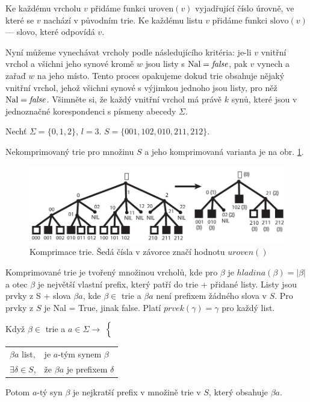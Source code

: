 \newcommand{\uro}{\textrm{uroven}}
Ke každému vrcholu $v$ přidáme funkci $\uro(v)$ vyjadřující číslo úrovně,
ve které se $v$ nachází v původním trie.
\newcommand{\slo}{\textrm{slovo}}
Ke každému listu $v$ přidáme funkci $\slo(v)$ --- slovo, které odpovídá $v$.

Nyní můžeme vynechávat vrcholy podle následujícího kritéria: 
je-li $v$ vnitřní vrchol a všichni jeho synové kromě $w$ jsou listy s
$\textrm{Nal} = \textit{false}$, pak $v$ vynech a zařaď $w$ na jeho místo. Tento proces 
opakujeme dokud trie obsahuje nějaký vnitřní vrchol, jehož všichni synové 
s výjimkou jednoho jsou listy, pro něž $\textrm{Nal} = \textit{false}$. 
Všimněte si, že každý vnitřní vrchol má právě $k$ synů, které jsou 
v jednoznačné korespondenci s písmeny abecedy $\Sigma$.

\begin{priklad}
Nechť $\Sigma = \{0,1,2\}$, $l=3$.
$S = \{ 001,102,010,211,212 \}$.

Nekomprimovaný trie pro množinu $S$ a jeho komprimovaná varianta je na
obr. \ref{fig:tries.compr1}.

\begin{figure}
\centering\includegraphics{pics/trie-compr1}
\caption{Komprimace trie. Šedá čísla v závorce značí hodnotu $uroven()$}
\label{fig:tries.compr1}
\end{figure}

\end{priklad}


\begin{pozn}
Komprimované trie je tvořený množinou vrcholů, kde pro $\beta$ je
$hladina(\beta) = |\beta|$ a otec $\beta$ je největší vlastní prefix,
který patří do trie + přidané listy. Listy jsou prvky z S + slova $\beta
a$, kde $\beta \in$ trie a $\beta a$ není prefixem žádného slova v $S$. 
Pro prvky z $S$ je Nal = True, jinak false. 
Platí $prvek(\gamma) = \gamma$ pro každý list.

Když $\beta \in$ trie a $a \in \Sigma \rightarrow$
$\Bigl\{$
\begin{tabular}{ll}
$\beta a$ list, & je $a$-tým synem $\beta$ \\
$\exists \delta \in S$, & že $\beta a$ je prefixem $\delta$
\end{tabular}

Potom $a$-tý syn $\beta$ je nejkratší prefix v množině trie v $S$, který
obsahuje $\beta a$.
\end{pozn}

